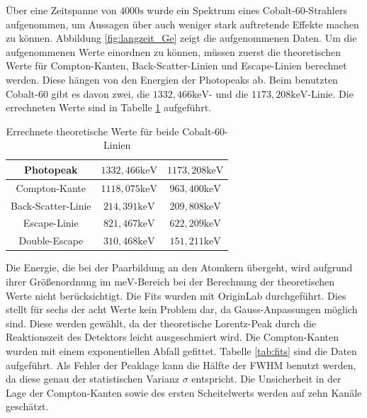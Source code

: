 \documentclass[
	parskip=half,10pt,
	numbers= noenddot, %
	toc=flat, %
	oneside,
	twocolumn,
	]{scrartcl}
\begin{document}
Über eine Zeitspanne von $4000 \si{\second}$ wurde ein Spektrum eines Cobalt-60-Strahlers aufgenommen, um Aussagen über auch weniger stark auftretende Effekte machen zu 
können. Abbildung \ref{fig:langzeit_Ge} zeigt die aufgenommenen Daten. Um die aufgenommenen Werte einordnen zu können, müssen zuerst die theoretischen Werte für 
Compton-Kanten, Back-Scatter-Linien und Escape-Linien berechnet 
werden. Diese hängen von den Energien der Photopeaks ab. Beim benutzten Cobalt-60 gibt es davon zwei, die $1332,466 \si{\kilo \electronvolt}$- und die 
$1173,208 \si{\kilo \electronvolt}$-Linie. Die errechneten Werte sind in Tabelle \ref{tab:theo} aufgeführt. 

\begin{table}
\begin{tabular}{ccc}
Photopeak & $1332,466 \si{\kilo \electronvolt}$ & $1173,208 \si{\kilo \electronvolt}$ \\
 \hline 
Compton-Kante & $1118,075 \si{\kilo \electronvolt}$ &  $963,400 \si{\kilo \electronvolt}$\\
Back-Scatter-Linie &  $214,391 \si{\kilo \electronvolt}$ &  $209,808 \si{\kilo \electronvolt}$ \\
Escape-Linie & $821,467 \si{\kilo \electronvolt}$ & $622,209 \si{\kilo \electronvolt}$ \\
Double-Escape & $310,468 \si{\kilo \electronvolt}$ & $151,211 \si{\kilo \electronvolt}$
\end{tabular}
\caption{Errechnete theoretische Werte für beide Cobalt-60-Linien}
\label{tab:theo}
\end{table}

Die Energie, die bei der Paarbildung an den Atomkern übergeht, wird aufgrund ihrer Größenordnung im $\si{\milli \electronvolt}$-Bereich bei der Berechnung der 
theoretischen Werte nicht berücksichtigt. Die Fits wurden mit OriginLab durchgeführt. Dies stellt für sechs der acht Werte kein Problem dar, da Gauss-Anpassungen 
möglich sind. Diese werden gewählt, da der theoretische Lorentz-Peak durch die Reaktionszeit des Detektors leicht ausgeschmiert wird. Die Compton-Kanten 
wurden mit einem exponentiellen Abfall gefittet. Tabelle \ref{tab:fits} sind die Daten aufgeführt. Als Fehler der Peaklage kann die Hälfte der FWHM benutzt werden, 
da diese genau der statistischen Varianz $\sigma$ entspricht. Die Unsicherheit in der Lage der Compton-Kanten sowie des ersten Scheitelwerts werden auf zehn Kanäle 
geschätzt. 
\end{document}
